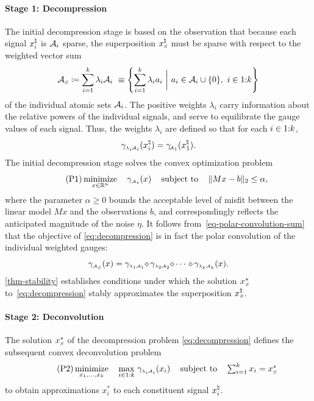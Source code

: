 \paragraph{Stage 1: Decompression} The initial decompression stage is based on the observation
that because each signal $x_i^{\natural}$ is $\mathcal{A}_i$ sparse, the superposition $x_{\scriptscriptstyle S}^\natural$
must be sparse with respect to the weighted vector sum
\begin{equation} \label{eq:weighted-atomic-sum}
  \mathcal{A}_{\scriptscriptstyle S}\coloneqq\sum_{i=1}^k\lambda_i\mathcal{A}_i
  ~\equiv \left\{\sum_{i=1}^k\lambda_ia_i ~\bigg\vert~ a_i\in\mathcal{A}_i\cup\{0\},\ i\in1\mathord{:}k\right\}
\end{equation}
of the individual atomic sets $\mathcal{A}_i$. The positive weights $\lambda_i$ carry information about the relative powers of the individual signals, and serve to equilibrate the gauge values of each signal. Thus, the weights $\lambda_i$ are defined so that for each $i\in1\mathord{:}k$,
\begin{equation}\label{eq-lambda-def}
  \gamma_{\scriptscriptstyle\lambda_i\mathcal{A}_i}(x_i^{\natural})=\gamma_{\!\scriptscriptstyle\mathcal{A}_1}(x_1^{\natural}). 
\end{equation}
The initial decompression stage solves the convex optimization problem
\begin{equation} \tag{P1} \label{eq:decompression}
  \displaystyle\mathop{\hbox{\rm minimize}}_{x\in\mathbb{R}^n}\enspace\enspace \gamma_{\scriptscriptstyle\mathcal{A}_s}(x) \enspace\enspace\mathop{\hbox{\rm subject to}}\enspace\enspace \|Mx - b\|_2 \leq \alpha,
\end{equation}
where the parameter $\alpha\ge0$ bounds the acceptable level of misfit between the linear model \(Mx\) and the observations $b$, and correspondingly reflects the anticipated magnitude of the noise $\eta$. It follows from~\eqref{eq-polar-convolution-sum} that the objective of \eqref{eq:decompression} is in fact the polar convolution of the individual weighted gauges:
\begin{equation*}
   \gauge_{\scriptscriptstyle\Ascr\subs}(x)
   = \gauge_{\scriptscriptstyle\lambda_1\Ascr_1}\maxconv\gauge_{\scriptscriptstyle\lambda_2\Ascr_2}\maxconv\cdots\ \maxconv\gauge_{\scriptscriptstyle\lambda_k\Ascr_k}(x).
\end{equation*}
\autoref{thm-stability} establishes conditions under which the solution $x_{\scriptscriptstyle S}^*$ to~\eqref{eq:decompression} stably approximates the superposition $x_{\scriptscriptstyle S}^\natural$.

\paragraph{Stage 2: Deconvolution} The solution $x_{\scriptscriptstyle S}^*$ of the decompression problem \eqref{eq:decompression} defines the subsequent convex deconvolution problem
\begin{equation} \tag{P2} \label{eq:deconvolution}
  \displaystyle\mathop{\hbox{\rm minimize}}_{x_1, \ldots, x_k}\enspace
  \enspace \max_{i\in1:k}\, \gamma_{\scriptscriptstyle\lambda_i\mathcal{A}_i}(x_i)
  \enspace\enspace\mathop{\hbox{\rm subject to}}\enspace\enspace
  \textstyle\sum_{i = 1}^k x_i = x_{\scriptscriptstyle S}^*
\end{equation}
to obtain approximations $x_i^*$ to each constituent signal $x_i^{\natural}$. 

